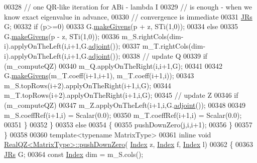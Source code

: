 \begin{DoxyCode}
00328           \textcolor{comment}{// one QR-like iteration for ABi - lambda I}
00329           \textcolor{comment}{// is enough - when we know exact eigenvalue in advance,}
00330           \textcolor{comment}{// convergence is immediate}
00331           \hyperlink{group___jacobi___module_class_eigen_1_1_jacobi_rotation}{JRs} G;
00332           \textcolor{keywordflow}{if} (p>=0)
00333             G.\hyperlink{group___jacobi___module_af73c81e9cc139b7e0d877ce553b02ec0}{makeGivens}(p + z, STi(1,0));
00334           \textcolor{keywordflow}{else}
00335             G.\hyperlink{group___jacobi___module_af73c81e9cc139b7e0d877ce553b02ec0}{makeGivens}(p - z, STi(1,0));
00336           m\_S.rightCols(dim-i).applyOnTheLeft(i,i+1,G.\hyperlink{group___jacobi___module_a89c8ea615f8fa77ddd5810a1e5fde4da}{adjoint}());
00337           m\_T.rightCols(dim-i).applyOnTheLeft(i,i+1,G.\hyperlink{group___jacobi___module_a89c8ea615f8fa77ddd5810a1e5fde4da}{adjoint}());
00338           \textcolor{comment}{// update Q}
00339           \textcolor{keywordflow}{if} (m\_computeQZ)
00340             m\_Q.applyOnTheRight(i,i+1,G);
00341 
00342           G.\hyperlink{group___jacobi___module_af73c81e9cc139b7e0d877ce553b02ec0}{makeGivens}(m\_T.coeff(i+1,i+1), m\_T.coeff(i+1,i));
00343           m\_S.topRows(i+2).applyOnTheRight(i+1,i,G);
00344           m\_T.topRows(i+2).applyOnTheRight(i+1,i,G);
00345           \textcolor{comment}{// update Z}
00346           \textcolor{keywordflow}{if} (m\_computeQZ)
00347             m\_Z.applyOnTheLeft(i+1,i,G.\hyperlink{group___jacobi___module_a89c8ea615f8fa77ddd5810a1e5fde4da}{adjoint}());
00348 
00349           m\_S.coeffRef(i+1,i) = Scalar(0.0);
00350           m\_T.coeffRef(i+1,i) = Scalar(0.0);
00351         \}
00352       \}
00353       \textcolor{keywordflow}{else}
00354       \{
00355         pushDownZero(j,i,i+1);
00356       \}
00357     \}
00358 
00360   \textcolor{keyword}{template}<\textcolor{keyword}{typename} MatrixType>
00361     \textcolor{keyword}{inline} \textcolor{keywordtype}{void} \hyperlink{group___eigenvalues___module_class_eigen_1_1_real_q_z}{RealQZ<MatrixType>::pushDownZero}(
      \hyperlink{group___eigenvalues___module_a6201e534e901b5f4e66f72c176b534a3}{Index} z, \hyperlink{group___eigenvalues___module_a6201e534e901b5f4e66f72c176b534a3}{Index} f, \hyperlink{group___eigenvalues___module_a6201e534e901b5f4e66f72c176b534a3}{Index} l)
00362     \{
00363       \hyperlink{group___jacobi___module_class_eigen_1_1_jacobi_rotation}{JRs} G;
00364       \textcolor{keyword}{const} \hyperlink{group___eigenvalues___module_a6201e534e901b5f4e66f72c176b534a3}{Index} dim = m\_S.cols();

\end{DoxyCode}
